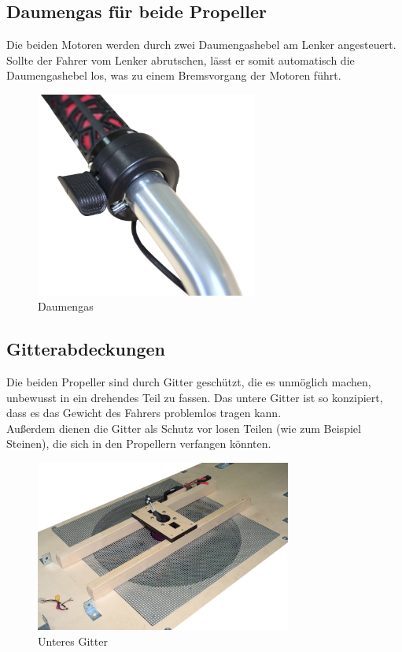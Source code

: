 \subsection{Daumengas für beide Propeller}
Die beiden Motoren werden durch zwei Daumengashebel am Lenker angesteuert. Sollte der Fahrer vom Lenker abrutschen, lässt er somit automatisch die Daumengashebel los, was zu einem Bremsvorgang der Motoren führt.
\begin{figure}[h]
    \centering
    \includegraphics[width=0.65\textwidth]{Fotos/Daumengas.png}
    \caption{Daumengas}    
\end{figure}

\newpage
\subsection{Gitterabdeckungen}
Die beiden Propeller sind durch Gitter geschützt, die es unmöglich machen, unbewusst in ein drehendes Teil zu fassen. Das untere Gitter ist so konzipiert, dass es das Gewicht des Fahrers problemlos tragen kann.\\
Außerdem dienen die Gitter als Schutz vor losen Teilen (wie zum Beispiel Steinen), die sich in den Propellern verfangen könnten.
\begin{figure}[H]
    \centering
    \includegraphics[width=0.75\textwidth]{Fotos/Konstruktion/DSC_8718_gitter_unten.png}
    \caption{Unteres Gitter}    
\end{figure}

